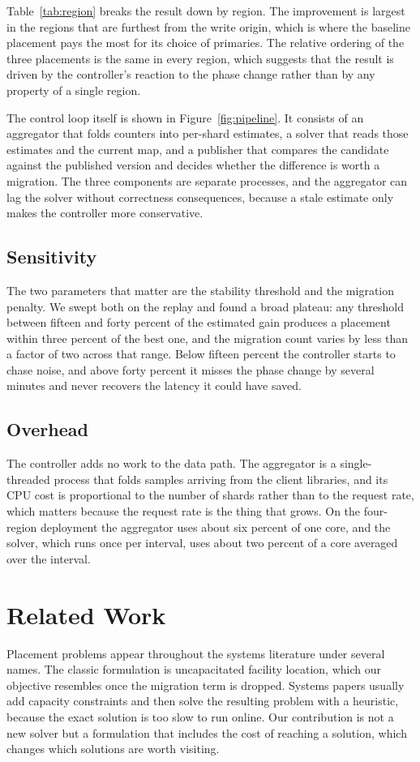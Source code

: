 ﻿\documentclass[10pt,twocolumn,letterpaper]{article}
\begin{document}
Table~\ref{tab:region} breaks the result down by region. The improvement is largest in
the regions that are furthest from the write origin, which is where the baseline
placement pays the most for its choice of primaries. The relative ordering of the three
placements is the same in every region, which suggests that the result is driven by the
controller's reaction to the phase change rather than by any property of a single region.

The control loop itself is shown in Figure~\ref{fig:pipeline}. It consists of an
aggregator that folds counters into per-shard estimates, a solver that reads those
estimates and the current map, and a publisher that compares the candidate against the
published version and decides whether the difference is worth a migration. The three
components are separate processes, and the aggregator can lag the solver without
correctness consequences, because a stale estimate only makes the controller more
conservative.

\subsection{Sensitivity}
The two parameters that matter are the stability threshold and the migration penalty. We
swept both on the replay and found a broad plateau: any threshold between fifteen and
forty percent of the estimated gain produces a placement within three percent of the best
one, and the migration count varies by less than a factor of two across that range. Below
fifteen percent the controller starts to chase noise, and above forty percent it misses
the phase change by several minutes and never recovers the latency it could have saved.

\subsection{Overhead}
The controller adds no work to the data path. The aggregator is a single-threaded process
that folds samples arriving from the client libraries, and its CPU cost is proportional
to the number of shards rather than to the request rate, which matters because the request
rate is the thing that grows. On the four-region deployment the aggregator uses about six
percent of one core, and the solver, which runs once per interval, uses about two percent
of a core averaged over the interval.

\section{Related Work}
Placement problems appear throughout the systems literature under several names. The
classic formulation is uncapacitated facility location, which our objective resembles
once the migration term is dropped. Systems papers usually add capacity constraints and
then solve the resulting problem with a heuristic, because the exact solution is too slow
to run online. Our contribution is not a new solver but a formulation that includes the
cost of reaching a solution, which changes which solutions are worth visiting.
\end{document}
